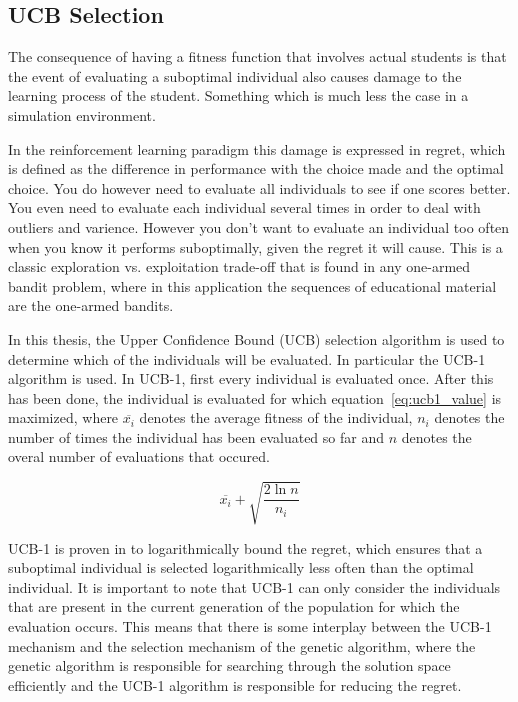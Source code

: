 \subsection{UCB Selection}
\label{sec:approach_ucb}
The consequence of having a fitness function that involves actual
students is that the event of evaluating a suboptimal individual
also causes damage to the learning process of the student. Something
which is much less the case in a simulation environment.

In the reinforcement learning paradigm this damage is expressed in regret, which
is defined as the difference in performance with the choice made and the
optimal choice. You do however need to evaluate all individuals to see if one
scores better. You even need to evaluate each individual several times in order
to deal with outliers and varience. However you don't want to evaluate an
individual too often when you know it performs suboptimally, given the regret
it will cause. This is a classic exploration vs. exploitation trade-off that is
found in any one-armed bandit problem, where in this application the sequences
of educational material are the one-armed bandits.

In this thesis, the Upper Confidence Bound (UCB) selection algorithm is used to
determine which of the individuals will be evaluated. In
particular the UCB-1\cite{Auer2002} algorithm is used. In UCB-1,
first every individual is evaluated once. After this has been done, the
individual is evaluated for which equation~\eqref{eq:ucb1_value} is maximized,
where $\overline{x_i}$ denotes the average fitness of the individual, $n_i$
denotes the number of times the individual has been evaluated so far and $n$
denotes the overal number of evaluations that occured.

\begin{equation}
	\overline{x_i} + \sqrt{\frac{2 \ln n}{n_i}}
	\label{eq:ucb1_value}
\end{equation}

UCB-1 is proven in \cite{Auer2002} to logarithmically bound the
regret, which ensures that a suboptimal individual is selected logarithmically
less often than the optimal individual. It is important to note that UCB-1 can
only consider the individuals that are present in the current generation of the
population for which the evaluation occurs. This means that there is some
interplay between the UCB-1 mechanism and the selection mechanism of the
genetic algorithm, where the genetic algorithm is responsible for searching
through the solution space efficiently and the UCB-1 algorithm is responsible
for reducing the regret.

